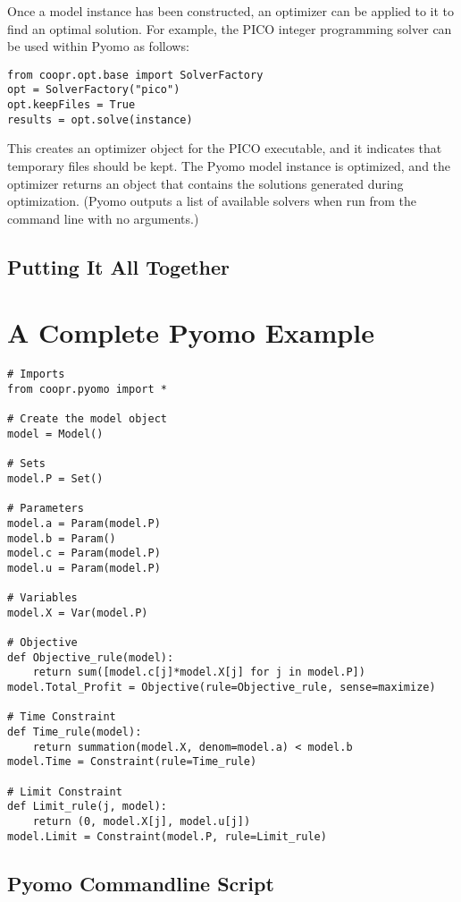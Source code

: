 Once a model instance has been constructed, an optimizer can be applied to it to find an optimal solution.  For example, the PICO integer programming solver can be used within Pyomo as follows:
\begin{lstlisting}
from coopr.opt.base import SolverFactory
opt = SolverFactory("pico")
opt.keepFiles = True
results = opt.solve(instance)
\end{lstlisting}
This creates an optimizer object for the PICO executable, and it indicates that
temporary files should be kept.  The Pyomo model instance is optimized, and the
optimizer returns an object that contains the solutions generated during
optimization.  (Pyomo outputs a list of available solvers when run from the
command line with no arguments.)


\subsection{Putting It All Together}

\newpage
\section{A Complete Pyomo Example}
\label{sec:simple}

\begin{lstlisting}
# Imports
from coopr.pyomo import *

# Create the model object
model = Model()

# Sets
model.P = Set()

# Parameters
model.a = Param(model.P)
model.b = Param()
model.c = Param(model.P)
model.u = Param(model.P)

# Variables
model.X = Var(model.P)

# Objective
def Objective_rule(model):
    return sum([model.c[j]*model.X[j] for j in model.P])
model.Total_Profit = Objective(rule=Objective_rule, sense=maximize)

# Time Constraint
def Time_rule(model):
    return summation(model.X, denom=model.a) < model.b
model.Time = Constraint(rule=Time_rule)

# Limit Constraint
def Limit_rule(j, model):
    return (0, model.X[j], model.u[j])
model.Limit = Constraint(model.P, rule=Limit_rule)
\end{lstlisting}



\subsection{Pyomo Commandline Script}
\label{sec:script}

